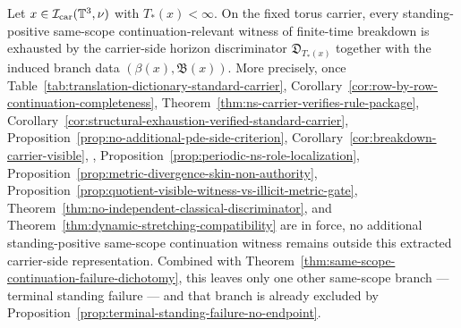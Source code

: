 \begin{manualproposition}
\label{prop:same-scope-witness-exhaustion}
Let $x\in\mathcal I_{\mathrm{car}}(\mathbb{T}^3,\nu)$ with $T_*(x)<\infty$. On the fixed torus carrier, every standing-positive same-scope continuation-relevant witness of finite-time breakdown is exhausted by the carrier-side horizon discriminator $\mathfrak D_{T_*(x)}$ together with the induced branch data $(\beta(x),\mathfrak B(x))$. More precisely, once Table~\ref{tab:translation-dictionary-standard-carrier}, Corollary~\ref{cor:row-by-row-continuation-completeness}, Theorem~\ref{thm:ns-carrier-verifies-rule-package}, Corollary~\ref{cor:structural-exhaustion-verified-standard-carrier}, Proposition~\ref{prop:no-additional-pde-side-criterion}, Corollary~\ref{cor:breakdown-carrier-visible}, \HorizonDetectabilityRef{}, Proposition~\ref{prop:periodic-ns-role-localization}, Proposition~\ref{prop:metric-divergence-skin-non-authority}, Proposition~\ref{prop:quotient-visible-witness-vs-illicit-metric-gate}, Theorem~\ref{thm:no-independent-classical-discriminator}, and Theorem~\ref{thm:dynamic-stretching-compatibility} are in force, no additional standing-positive same-scope continuation witness remains outside this extracted carrier-side representation. Combined with Theorem~\ref{thm:same-scope-continuation-failure-dichotomy}, this leaves only one other same-scope branch --- terminal standing failure --- and that branch is already excluded by Proposition~\ref{prop:terminal-standing-failure-no-endpoint}.
\end{manualproposition}

